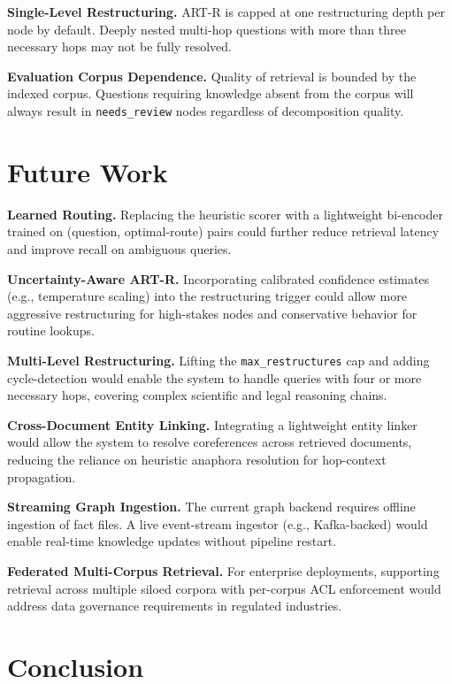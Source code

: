 \documentclass[conference]{IEEEtran}
\begin{document}
\textbf{Single-Level Restructuring.}  ART-R is capped at one
restructuring depth per node by default.  Deeply nested multi-hop
questions with more than three necessary hops may not be fully resolved.

\textbf{Evaluation Corpus Dependence.}  Quality of retrieval is
bounded by the indexed corpus.  Questions requiring knowledge absent
from the corpus will always result in \texttt{needs\_review} nodes
regardless of decomposition quality.

\section{Future Work}
\label{sec:future}

\textbf{Learned Routing.}  Replacing the heuristic scorer with a
lightweight bi-encoder trained on (question, optimal-route) pairs
could further reduce retrieval latency and improve recall on
ambiguous queries.

\textbf{Uncertainty-Aware ART-R.}  Incorporating calibrated
confidence estimates (e.g., temperature scaling) into the
restructuring trigger could allow more aggressive restructuring
for high-stakes nodes and conservative behavior for routine lookups.

\textbf{Multi-Level Restructuring.}  Lifting the \texttt{max\_restructures}
cap and adding cycle-detection would enable the system to handle
queries with four or more necessary hops, covering complex
scientific and legal reasoning chains.

\textbf{Cross-Document Entity Linking.}  Integrating a lightweight
entity linker would allow the system to resolve coreferences across
retrieved documents, reducing the reliance on heuristic anaphora
resolution for hop-context propagation.

\textbf{Streaming Graph Ingestion.}  The current graph backend
requires offline ingestion of fact files.  A live event-stream
ingestor (e.g., Kafka-backed) would enable real-time knowledge
updates without pipeline restart.

\textbf{Federated Multi-Corpus Retrieval.}  For enterprise deployments,
supporting retrieval across multiple siloed corpora with per-corpus
ACL enforcement would address data governance requirements in
regulated industries.

\section{Conclusion}
\label{sec:conc}
\end{document}

